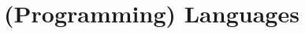 \documentclass[a4paper,10pt]{article} %
\begin{document}
%
\renewcommand{\arraystretch}{1.2}


\section{(Programming) Languages}
\end{document}
